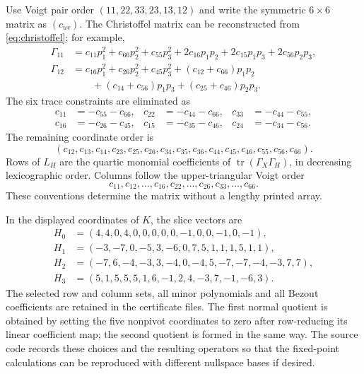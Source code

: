 \documentclass[11pt]{amsart}
\theoremstyle{remark}
\newcommand{\tr}{\operatorname{tr}}
\begin{document}
Use Voigt pair order $(11,22,33,23,13,12)$ and write the symmetric $6\times6$ matrix as $(c_{uv})$. The Christoffel matrix can be reconstructed from \eqref{eq:christoffel}; for example,
\begin{align*}
 \Gamma_{11}&=c_{11}p_1^2+c_{66}p_2^2+c_{55}p_3^2
 +2c_{16}p_1p_2+2c_{15}p_1p_3+2c_{56}p_2p_3,\\
 \Gamma_{12}&=c_{16}p_1^2+c_{26}p_2^2+c_{45}p_3^2
 +(c_{12}+c_{66})p_1p_2\\
 &\hspace{2em}+(c_{14}+c_{56})p_1p_3+(c_{25}+c_{46})p_2p_3.
\end{align*}
The six trace constraints are eliminated as
\begin{align*}
 c_{11}&=-c_{55}-c_{66},&c_{22}&=-c_{44}-c_{66},&c_{33}&=-c_{44}-c_{55},\\
 c_{16}&=-c_{26}-c_{45},&c_{15}&=-c_{35}-c_{46},&c_{24}&=-c_{34}-c_{56}.
\end{align*}
The remaining coordinate order is
\[
 (c_{12},c_{13},c_{14},c_{23},c_{25},c_{26},c_{34},c_{35},c_{36},
 c_{44},c_{45},c_{46},c_{55},c_{56},c_{66}).
\]
Rows of $L_H$ are the quartic monomial coefficients of $\tr(\Gamma_X\Gamma_H)$, in decreasing lexicographic order. Columns follow the upper-triangular Voigt order
\[
 c_{11},c_{12},\ldots,c_{16},c_{22},\ldots,c_{26},c_{33},\ldots,c_{66}.
\]
These conventions determine the matrix without a lengthy printed array.

In the displayed coordinates of $K$, the slice vectors are
\begingroup\small
\begin{align*}
 H_0&=(4,4,0,4,0,0,0,0,0,-1,0,0,-1,0,-1),\\
 H_1&=(-3,-7,0,-5,3,-6,0,7,5,1,1,1,5,1,1),\\
 H_2&=(-7,6,-4,-3,3,-4,0,-4,5,-7,-7,-4,-3,7,7),\\
 H_3&=(5,1,5,5,5,1,6,-1,2,4,-3,7,-1,-6,3).
\end{align*}
\endgroup
The selected row and column sets, all minor polynomials and all Bezout coefficients are retained in the certificate files. The first normal quotient is obtained by setting the five nonpivot coordinates to zero after row-reducing its linear coefficient map; the second quotient is formed in the same way. The source code records these choices and the resulting operators so that the fixed-point calculations can be reproduced with different nullspace bases if desired.



\end{document}
